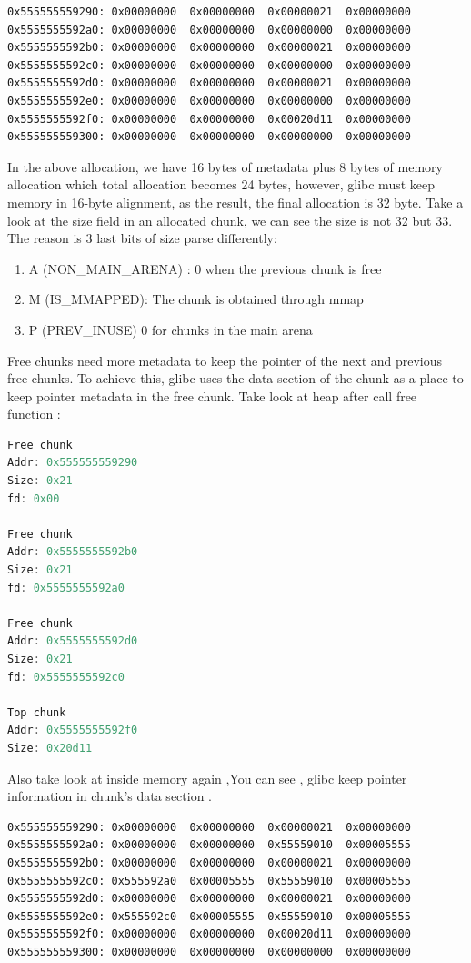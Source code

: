 \documentclass{masterthesis}
\newcommand*\libc{glibc}
\begin{document}
\begin{lstlisting}[frame=tlrb]
0x555555559290:	0x00000000	0x00000000	0x00000021	0x00000000
0x5555555592a0:	0x00000000	0x00000000	0x00000000	0x00000000
0x5555555592b0:	0x00000000	0x00000000	0x00000021	0x00000000
0x5555555592c0:	0x00000000	0x00000000	0x00000000	0x00000000
0x5555555592d0:	0x00000000	0x00000000	0x00000021	0x00000000
0x5555555592e0:	0x00000000	0x00000000	0x00000000	0x00000000
0x5555555592f0:	0x00000000	0x00000000	0x00020d11	0x00000000
0x555555559300:	0x00000000	0x00000000	0x00000000	0x00000000
\end{lstlisting}

In the above allocation, we have 16 bytes of metadata plus 8 bytes of memory allocation which total allocation becomes 24 bytes, however, \libc{} must keep memory in 16-byte alignment, as the result, the final allocation is 32 byte. Take a look at the size field in an allocated chunk, we can see the size is not 32 but 33. The reason is 3 last bits of size parse differently:
\begin{enumerate}
	\item A (NON\_MAIN\_ARENA) : 0 when the previous chunk is free
	\item M (IS\_MMAPPED): The chunk is obtained through mmap
	\item P (PREV\_INUSE) 0 for chunks in the main arena
\end{enumerate}
Free chunks need more metadata to keep the pointer of the next and previous free chunks. To achieve this, \libc{} uses the data section of the chunk as a place to keep pointer metadata in the free chunk. Take look at heap after call free function :

\begin{lstlisting}[language=c,frame=tlrb]
Free chunk 
Addr: 0x555555559290
Size: 0x21
fd: 0x00

Free chunk
Addr: 0x5555555592b0
Size: 0x21
fd: 0x5555555592a0

Free chunk 
Addr: 0x5555555592d0
Size: 0x21
fd: 0x5555555592c0

Top chunk
Addr: 0x5555555592f0
Size: 0x20d11
\end{lstlisting}

Also take look at inside memory again ,You can see , \libc{} keep pointer information in chunk's data section .

\begin{lstlisting}[frame=tlrb]
0x555555559290:	0x00000000	0x00000000	0x00000021	0x00000000
0x5555555592a0:	0x00000000	0x00000000	0x55559010	0x00005555
0x5555555592b0:	0x00000000	0x00000000	0x00000021	0x00000000
0x5555555592c0:	0x555592a0	0x00005555	0x55559010	0x00005555
0x5555555592d0:	0x00000000	0x00000000	0x00000021	0x00000000
0x5555555592e0:	0x555592c0	0x00005555	0x55559010	0x00005555
0x5555555592f0:	0x00000000	0x00000000	0x00020d11	0x00000000
0x555555559300:	0x00000000	0x00000000	0x00000000	0x00000000
\end{lstlisting}
 
\end{document}
